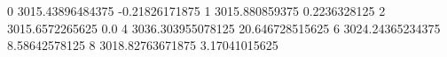 0 3015.43896484375 -0.21826171875
1 3015.880859375 0.2236328125
2 3015.6572265625 0.0
4 3036.303955078125 20.646728515625
6 3024.24365234375 8.58642578125
8 3018.82763671875 3.17041015625
